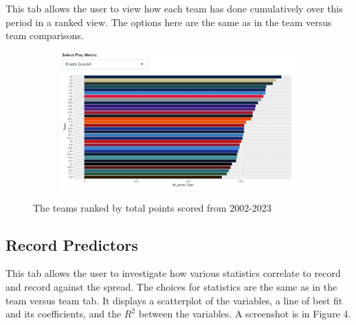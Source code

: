 \documentclass{article}
\begin{document}
This tab allows the user to view how each team has done cumulatively
over this period in a ranked view. The options here are the same
as in the team versus team comparisons.

\begin{figure}[H]
    \centering
    \begin{subfigure}{0.8\textwidth}
        \centering
        \includegraphics[width=\textwidth]{../screenshots/team-totals.png}
    \end{subfigure}\hfill
    \caption{The teams ranked by total points scored from 2002-2023}
\end{figure}

\subsection{Record Predictors}

This tab allows the user to investigate how various statistics correlate
to record and record against the spread. The choices for statistics are the
same as in the team versus team tab. It displays a scatterplot of the variables, 
a line of best fit and its coefficients, and the $R^{2}$ between the variables.
A screenshot is in Figure 4.
\end{document}
